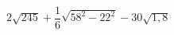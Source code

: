 \begin{ex}[type=calculate]
	\begin{condition}
		\( 2\sqrt{245}+\dfrac{1}{6}\sqrt{58^2-22^2}-30\sqrt{1,8} \)
	\end{condition}
\end{ex}